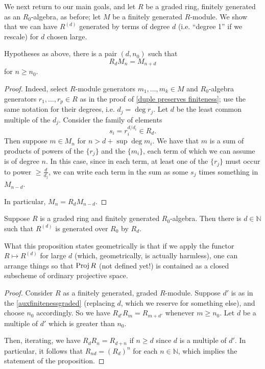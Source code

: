 We next return to our main goals, and let $R$ be a graded ring, finitely
generated as an $R_0$-algebra, as before; let $M$ be a finitely
generated $R$-module. We show that we can have $R^{(d)}$ generated by terms of degree $d$ (i.e.
``degree 1'' if we rescale) for $d$ chosen large.
\begin{lemma} \label{quickfinitenesslem}
Hypotheses as above, there is a pair $(d, n_0)$ such that
\[  R_d M_n = M_{n+d}  \]
for $n \geq n_0$.
\end{lemma} 
\begin{proof} 
Indeed, select $R$-module generators $m_1, \dots, m_k \in M$ and
$R_0$-algebra generators $r_1, \dots, r_p \in R$
as in the proof of \cref{duple preserves finiteness}; use the same
notation for their degrees, i.e. $d_j = \deg r_j$.
Let $d $ be the least common multiple of the $d_j$.  Consider the family of
elements
\[  s_i = r_i^{d/d_i} \in R_d. \]
Then suppose $m \in M_n$ for $n>d + \sup \deg m_i$.  We have that $m$ is a sum
of products of powers of the $\{r_j\}$ and the $\{m_i\}$, each term of which we can assume
is
of degree $n$.  In this case, since in each term, at least one
of the $\{r_j\}$ must occur to power $\geq \frac{d}{d_j}$, we can write each term
in the sum as some $s_j$ times something in $M_{n-d}$. 

In particular,
\( M_n  = R_d M_{n-d}.  \)
\end{proof} 

\begin{proposition} \label{auxfinitenessgraded}
Suppose $R$ is a graded ring and finitely generated $R_0$-algebra. Then there
is $d \in \mathbb{N}$ such that $R^{(d)}$ is generated over $R_0$ by $R_d$.
\end{proposition} 
What this proposition states geometrically is that if we apply the
functor $R \mapsto R^{(d)}$ for large $d$ (which, geometrically, is actually
harmless), one can arrange things so that $\operatorname{Proj} R$ (not defined yet!) is
contained as a closed subscheme of ordinary projective space.

\begin{proof} Consider $R$ as a finitely generated, graded $R$-module.
Suppose $d'$ is as in the \cref{auxfinitenessgraded} (replacing $d$, which we reserve for
something else), and choose $n_0$ accordingly.
So we have $R_{d'} R_{m} = R_{m + d'}$ whenever $m \geq n_0$.
Let $d$ be a multiple of $d'$
which is greater than $n_0$.

Then, iterating, we have $R_d R_n = R_{d+n}$ if $n \geq d$ since $d$ is a multiple of $d'$.
In particular, it follows that $R_{nd} = (R_d)^n$ for each $n \in \mathbb{N}$,
which implies the statement of the proposition.
\end{proof} 


